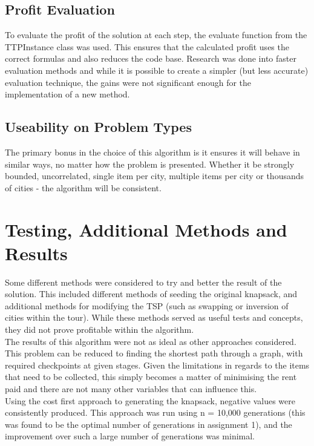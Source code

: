 \documentclass[a4paper, 12pt]{article}
\begin{document}
\newpage

\subsection{Profit Evaluation}
To evaluate the profit of the solution at each step, the evaluate function from the TTPInstance class was used. This ensures that the calculated profit uses the correct formulas and also reduces the code base. Research was done into faster evaluation methods and while it is possible to create a simpler (but less accurate) evaluation technique, the gains were not significant enough for the implementation of a new method.

\subsection{Useability on Problem Types}

The primary bonus in the choice of this algorithm is it ensures it will behave in similar ways, no matter how the problem is presented. Whether it be strongly bounded, uncorrelated, single item per city, multiple items per city or thousands of cities - the algorithm will be consistent. 

\section{Testing, Additional Methods and Results}

Some different methods were considered to try and better the result of the solution. This included different methods of seeding the original knapsack, and additional methods for modifying the TSP (such as swapping or inversion of cities within the tour). While these methods served as useful tests and concepts, they did not prove profitable within the algorithm. \\

The results of this algorithm were not as ideal as other approaches considered. This problem can be reduced to finding the shortest path through a graph, with required checkpoints at given stages. Given the limitations in regards to the items that need to be collected, this simply becomes a matter of minimising the rent paid and there are not many other variables that can influence this. \\

Using the cost first approach to generating the knapsack, negative values were consistently produced. This approach was run using n = 10,000 generations (this was found to be the optimal number of generations in assignment 1), and the improvement over such a large number of generations was minimal. \\
\end{document}
